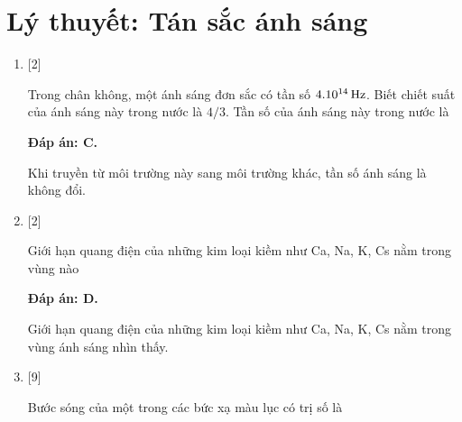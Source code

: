 \whiteBGstarBegin
\setcounter{section}{0}
\section{Lý thuyết: Tán sắc ánh sáng}
\begin{enumerate}[label=\bfseries Câu \arabic*:]

    \item {} [2]
    
	\cauhoi
	{Trong chân không, một ánh sáng đơn sắc có tần số $\xsi{4.10^{14}}{Hz}$. Biết chiết suất của ánh sáng này trong nước là $4/3$. Tần số của ánh sáng này trong nước là
	}
	
	\loigiai
	{		\textbf{Đáp án: C.}

Khi truyền từ môi trường này sang môi trường khác, tần số ánh sáng là không đổi.		
		
	}

    \item {} [2]
    
	\cauhoi
	{Giới hạn quang điện của những kim loại kiềm như Ca, Na, K, Cs nằm trong vùng nào
	}
	
	\loigiai
	{		\textbf{Đáp án: D.}
		
Giới hạn quang điện của những kim loại kiềm như Ca, Na, K, Cs nằm trong vùng ánh sáng nhìn thấy.
		
	}

    \item {} [9]
    
	\cauhoi
	{Bước sóng của một trong các bức xạ màu lục có trị số là
	}
	

\end{enumerate}
